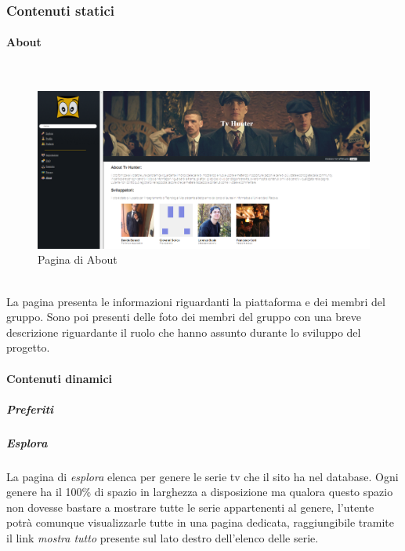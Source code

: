 \subsubsection{Contenuti statici}

\paragraph{About} 
~\\	

\begin{figure}[h!]
	\centerline{\includegraphics[scale=0.4]{img/about.png}}
	\caption{Pagina di About}
	\label{fig:addForm}
\end{figure}	

~\\	
La pagina presenta le informazioni riguardanti la piattaforma e dei membri del gruppo. Sono poi presenti delle foto dei membri del gruppo con una breve descrizione riguardante il ruolo che hanno assunto durante lo sviluppo del progetto. 


\paragraph{Contenuti dinamici}   

\subparagraph{Preferiti}

\subparagraph{Esplora}
La pagina di \textit{esplora} elenca per genere le serie tv che il sito ha nel database. Ogni genere ha il 100\% di spazio in larghezza a disposizione ma qualora questo spazio non dovesse bastare a mostrare tutte le serie appartenenti al genere, l'utente potrà comunque visualizzarle tutte in una pagina dedicata, raggiungibile tramite il link \textit{mostra tutto} presente sul lato destro dell'elenco delle serie.

